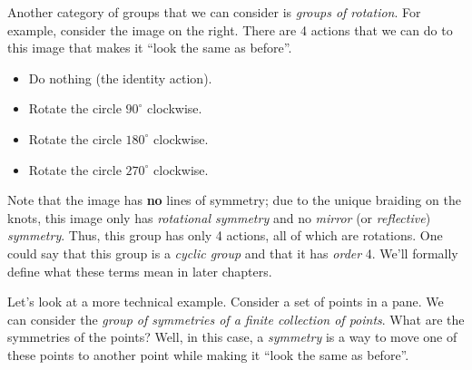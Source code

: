\begin{figure}
    \centering
\end{figure}

Another category of groups that we can consider is \textit{groups of rotation}. For example, consider the image on the right. There are 4 actions that we can do to this image that makes it ``look the same as before''.
\begin{itemize}
    \item Do nothing (the identity action).
    \item Rotate the circle $90^\circ$ clockwise.
    \item Rotate the circle $180^\circ$ clockwise.
    \item Rotate the circle $270^\circ$ clockwise.
\end{itemize}
Note that the image has \textbf{no} lines of symmetry; due to the unique braiding on the knots, this image only has \textit{rotational symmetry} and no \textit{mirror} (or \textit{reflective}) \textit{symmetry}. Thus, this group has only 4 actions, all of which are rotations. One could say that this group is a \textit{cyclic group} and that it has \textit{order} 4. We'll formally define what these terms mean in later chapters.

\begin{figure}
    \centering
\end{figure}

\newpage

Let's look at a more technical example. Consider a set of points in a pane. We can consider the \textit{group of symmetries of a finite collection of points}. What are the symmetries of the points? Well, in this case, a \textit{symmetry} is a way to move one of these points to another point while making it ``look the same as before''.

